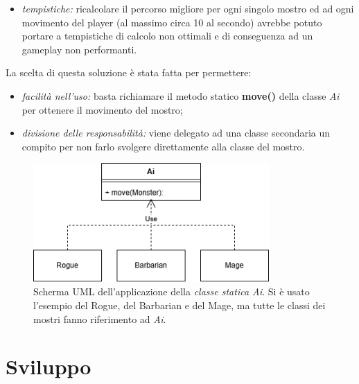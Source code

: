 \documentclass{report}
\begin{document}
\begin{itemize}
    \item \textit{tempistiche:} ricalcolare il percorso migliore per ogni singolo mostro ed ad ogni movimento del player (al massimo circa 10 al secondo) avrebbe potuto portare a tempistiche di calcolo
%
non ottimali e di conseguenza ad un gameplay non performanti.
\end{itemize}

%
La scelta di questa soluzione è stata fatta per permettere:

\begin{itemize}
    \item \textit{facilità nell'uso:} basta richiamare il metodo statico \textbf{move()} della classe \textit{Ai} per ottenere il movimento del mostro;
    \item \textit{divisione delle responsabilità:} viene delegato ad una classe secondaria un compito per non farlo svolgere direttamente alla classe del mostro.
\end{itemize}

\begin{figure}[H]
    \centering
    \includegraphics[width=9cm]{MonsterMovement.png}
    \caption{Scherma UML dell'applicazione della \textit{classe statica Ai}. Si è usato l'esempio del Rogue, del Barbarian e del Mage, ma tutte le classi dei mostri fanno riferimento ad \textit{Ai}.}
\end{figure}

\chapter{Sviluppo}
\end{document}
